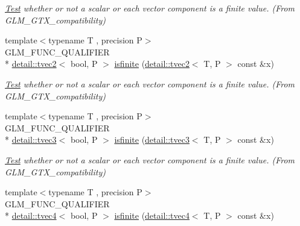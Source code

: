 \begin{DoxyCompactItemize}
\begin{DoxyCompactList}\small\item\em \hyperlink{class_test}{Test} whether or not a scalar or each vector component is a finite value. (From G\-L\-M\-\_\-\-G\-T\-X\-\_\-compatibility) \end{DoxyCompactList}\item 
\hypertarget{group__gtx__compatibility_ga604f38239da3a5b5b1e4fe06dec7f64d}{{\footnotesize template$<$typename T , precision P$>$ }\\G\-L\-M\-\_\-\-F\-U\-N\-C\-\_\-\-Q\-U\-A\-L\-I\-F\-I\-E\-R \\*
\hyperlink{structglm_1_1detail_1_1tvec2}{detail\-::tvec2}$<$ bool, P $>$ \hyperlink{group__gtx__compatibility_ga604f38239da3a5b5b1e4fe06dec7f64d}{isfinite} (\hyperlink{structglm_1_1detail_1_1tvec2}{detail\-::tvec2}$<$ T, P $>$ const \&x)}\label{group__gtx__compatibility_ga604f38239da3a5b5b1e4fe06dec7f64d}

\begin{DoxyCompactList}\small\item\em \hyperlink{class_test}{Test} whether or not a scalar or each vector component is a finite value. (From G\-L\-M\-\_\-\-G\-T\-X\-\_\-compatibility) \end{DoxyCompactList}\item 
\hypertarget{group__gtx__compatibility_ga416b6078bffd22e3a56a5c5379ba2cf8}{{\footnotesize template$<$typename T , precision P$>$ }\\G\-L\-M\-\_\-\-F\-U\-N\-C\-\_\-\-Q\-U\-A\-L\-I\-F\-I\-E\-R \\*
\hyperlink{structglm_1_1detail_1_1tvec3}{detail\-::tvec3}$<$ bool, P $>$ \hyperlink{group__gtx__compatibility_ga416b6078bffd22e3a56a5c5379ba2cf8}{isfinite} (\hyperlink{structglm_1_1detail_1_1tvec3}{detail\-::tvec3}$<$ T, P $>$ const \&x)}\label{group__gtx__compatibility_ga416b6078bffd22e3a56a5c5379ba2cf8}

\begin{DoxyCompactList}\small\item\em \hyperlink{class_test}{Test} whether or not a scalar or each vector component is a finite value. (From G\-L\-M\-\_\-\-G\-T\-X\-\_\-compatibility) \end{DoxyCompactList}\item 
\hypertarget{group__gtx__compatibility_gab256d4b6eaa066847d0629d6dde1dcba}{{\footnotesize template$<$typename T , precision P$>$ }\\G\-L\-M\-\_\-\-F\-U\-N\-C\-\_\-\-Q\-U\-A\-L\-I\-F\-I\-E\-R \\*
\hyperlink{structglm_1_1detail_1_1tvec4}{detail\-::tvec4}$<$ bool, P $>$ \hyperlink{group__gtx__compatibility_gab256d4b6eaa066847d0629d6dde1dcba}{isfinite} (\hyperlink{structglm_1_1detail_1_1tvec4}{detail\-::tvec4}$<$ T, P $>$ const \&x)}\label{group__gtx__compatibility_gab256d4b6eaa066847d0629d6dde1dcba}


\end{DoxyCompactItemize}
